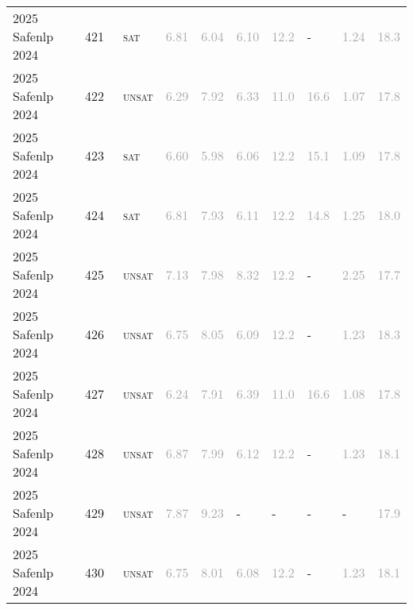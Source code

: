 \begin{center}
{\begin{longtable}{@{}llllllllll@{}}
2025 Safenlp 2024 & 421 & ~\textsc{sat} & \textcolor{darkgray}{6.81} & \textcolor{darkgray}{6.04} & \textcolor{darkgray}{6.10} & \textcolor{darkgray}{12.2} & - & \textcolor{darkgray}{1.24} & \textcolor{darkgray}{18.3} \\
2025 Safenlp 2024 & 422 & ~\textsc{unsat} & \textcolor{darkgray}{6.29} & \textcolor{darkgray}{7.92} & \textcolor{darkgray}{6.33} & \textcolor{darkgray}{11.0} & \textcolor{darkgray}{16.6} & \textcolor{darkgray}{1.07} & \textcolor{darkgray}{17.8} \\
2025 Safenlp 2024 & 423 & ~\textsc{sat} & \textcolor{darkgray}{6.60} & \textcolor{darkgray}{5.98} & \textcolor{darkgray}{6.06} & \textcolor{darkgray}{12.2} & \textcolor{darkgray}{15.1} & \textcolor{darkgray}{1.09} & \textcolor{darkgray}{17.8} \\
2025 Safenlp 2024 & 424 & ~\textsc{sat} & \textcolor{darkgray}{6.81} & \textcolor{darkgray}{7.93} & \textcolor{darkgray}{6.11} & \textcolor{darkgray}{12.2} & \textcolor{darkgray}{14.8} & \textcolor{darkgray}{1.25} & \textcolor{darkgray}{18.0} \\
2025 Safenlp 2024 & 425 & ~\textsc{unsat} & \textcolor{darkgray}{7.13} & \textcolor{darkgray}{7.98} & \textcolor{darkgray}{8.32} & \textcolor{darkgray}{12.2} & - & \textcolor{darkgray}{2.25} & \textcolor{darkgray}{17.7} \\
2025 Safenlp 2024 & 426 & ~\textsc{unsat} & \textcolor{darkgray}{6.75} & \textcolor{darkgray}{8.05} & \textcolor{darkgray}{6.09} & \textcolor{darkgray}{12.2} & - & \textcolor{darkgray}{1.23} & \textcolor{darkgray}{18.3} \\
2025 Safenlp 2024 & 427 & ~\textsc{unsat} & \textcolor{darkgray}{6.24} & \textcolor{darkgray}{7.91} & \textcolor{darkgray}{6.39} & \textcolor{darkgray}{11.0} & \textcolor{darkgray}{16.6} & \textcolor{darkgray}{1.08} & \textcolor{darkgray}{17.8} \\
2025 Safenlp 2024 & 428 & ~\textsc{unsat} & \textcolor{darkgray}{6.87} & \textcolor{darkgray}{7.99} & \textcolor{darkgray}{6.12} & \textcolor{darkgray}{12.2} & - & \textcolor{darkgray}{1.23} & \textcolor{darkgray}{18.1} \\
2025 Safenlp 2024 & 429 & ~\textsc{unsat} & \textcolor{darkgray}{7.87} & \textcolor{darkgray}{9.23} & - & - & - & - & \textcolor{darkgray}{17.9} \\
2025 Safenlp 2024 & 430 & ~\textsc{unsat} & \textcolor{darkgray}{6.75} & \textcolor{darkgray}{8.01} & \textcolor{darkgray}{6.08} & \textcolor{darkgray}{12.2} & - & \textcolor{darkgray}{1.23} & \textcolor{darkgray}{18.1} \\

\end{longtable}}
\end{center}
